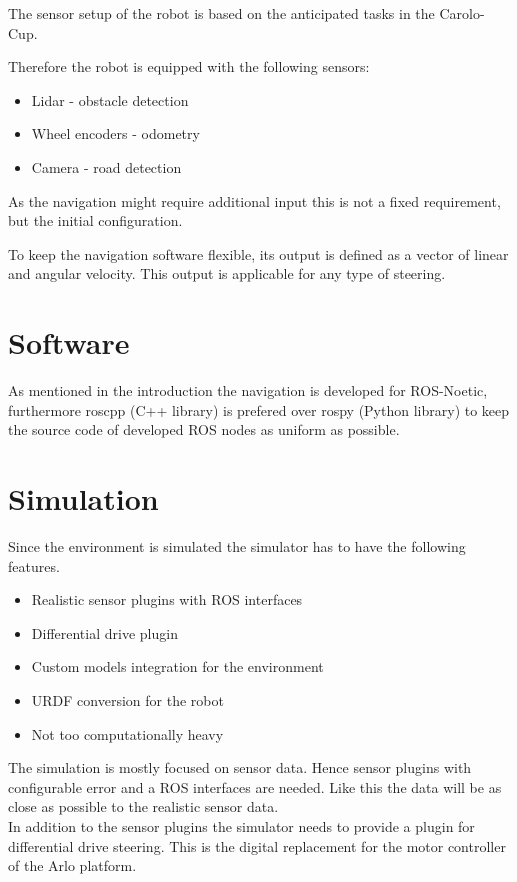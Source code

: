 The sensor setup of the robot is based on the anticipated tasks in the Carolo-Cup. 

Therefore the robot is equipped with the following sensors:

\begin{itemize}
	\item Lidar - obstacle detection
	\item Wheel encoders - odometry
	\item Camera - road detection
\end{itemize}

As the navigation might require additional input this is not a fixed requirement, but the initial configuration.

To keep the navigation software flexible, its output is defined as a vector of linear and angular velocity. This output is applicable for any type of steering.

\section{Software}
As mentioned in the introduction the navigation is developed for ROS-Noetic, furthermore roscpp (C++ library) is prefered over rospy (Python library) to keep the source code of developed ROS nodes as uniform as possible.

\section{Simulation}
Since the environment is simulated the simulator has to have the following features.
\begin{itemize}
	\item Realistic sensor plugins with ROS interfaces
	\item Differential drive plugin
	\item Custom models integration for the environment
	\item URDF conversion for the robot
	\item Not too computationally heavy
\end{itemize}

The simulation is mostly focused on sensor data. Hence sensor plugins with configurable error and a ROS interfaces are needed. Like this the data will be as close as possible to the realistic sensor data.\\

In addition to the sensor plugins the simulator needs to provide a plugin for differential drive steering. This is the digital replacement for the motor controller of the Arlo platform.\\

